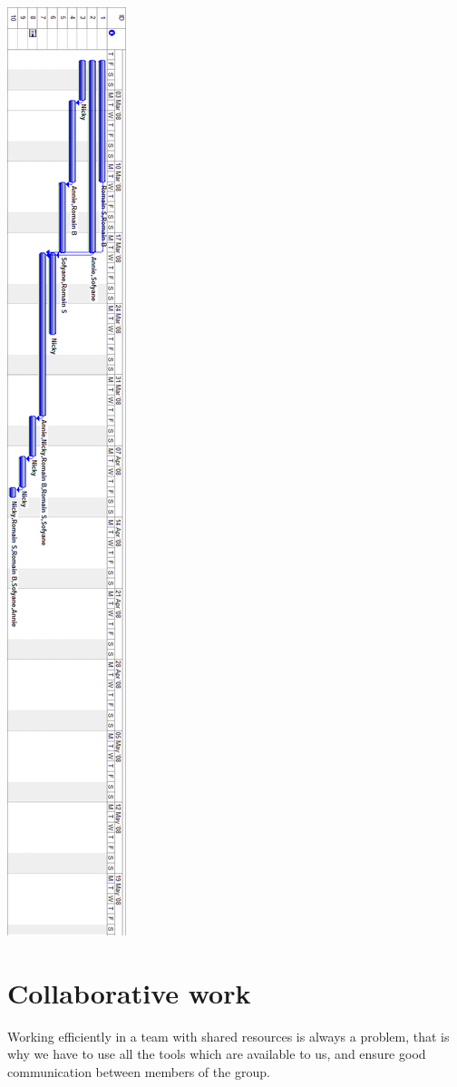 \documentclass[a4paper,12pt]{article}
\begin{document}
\newpage
\begin{center}
\includegraphics[scale=0.40]{gantt.png}
\end{center}
\newpage
\section{Collaborative work}
Working efficiently in a team with shared resources is always a problem, that is why we have to use all the tools which are available to us, and ensure good communication between members of the group.
\end{document}
